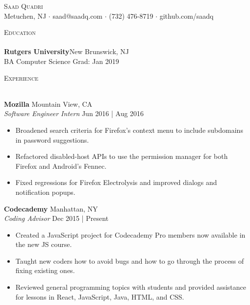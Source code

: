 \documentclass[a4paper]{article}
\newcommand{\lineunder} {
    \vspace*{-8pt} \\
    \hspace*{-18pt} \hrulefill \\
}
\newcommand{\header} [1] {
    {\hspace*{-18pt}\vspace*{6pt} \textsc{#1}}
    \vspace*{-6pt} \lineunder
}
\begin{document}
\vspace*{-40pt}

\vspace*{-10pt}
\begin{center}
	{\Huge \scshape {Saad Quadri}}\\
	Metuchen, NJ $\cdot$ saad@saadq.com $\cdot$ (732) 476-8719 $\cdot$ github.com/saadq\\
\end{center}

\vspace*{2mm}

\header{Education}
\textbf{Rutgers University}\hfill New Brunswick, NJ\\
BA Computer Science \hfill Grad: Jan 2019\\
\vspace{2mm}

\vspace*{2mm}

\header{Experience}
\vspace{1mm}

\textbf{Mozilla} \hfill Mountain View, CA\\
\textit{Software Engineer Intern} \hfill Jun 2016 | Aug 2016\\
\vspace{-1mm}
\begin{itemize} \itemsep 1pt
	\item Broadened search criteria for Firefox's context menu to include subdomains in password suggestions.
	\item Refactored disabled-host APIs to use the permission manager for both Firefox and Android's Fennec.
	\item Fixed regressions for Firefox Electrolysis and improved dialogs and notification popups.
\end{itemize}

\textbf{Codecademy} \hfill Manhattan, NY\\
\textit{Coding Advisor} \hfill Dec 2015 | Present\\
\vspace{-1mm}
\begin{itemize} \itemsep 1pt
	\item Created a JavaScript project for Codecademy Pro members now available in the new JS course.
	\item Taught new coders how to avoid bugs and how to go through the process of fixing existing ones.
	\item Reviewed general programming topics with students and provided assistance for lessons in React, JavaScript, Java, HTML, and CSS.
\end{itemize}
\end{document}
